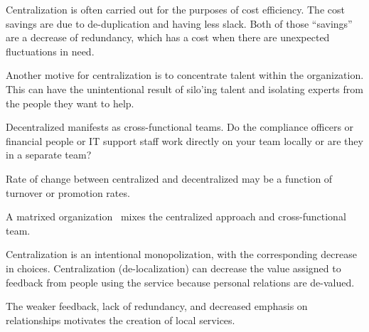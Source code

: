 
Centralization is often carried out for the purposes of cost efficiency. The cost savings are due to de-duplication and having less slack. Both of those ``savings'' are a decrease of redundancy, which has a cost when there are unexpected fluctuations in need. 

Another motive for centralization is to concentrate talent within the organization. This can have the unintentional result of silo'ing talent and isolating experts from the people they want to help.

Decentralized manifests as cross-functional teams. Do the compliance officers or financial people or IT support staff work directly on your team locally or are they in a separate team?

Rate of change between centralized and decentralized may be a function of turnover or promotion rates. 

A matrixed organization~\cite{1985_NASA} mixes the centralized approach and cross-functional team.



Centralization is an intentional monopolization, with the corresponding decrease in choices. 
Centralization (de-localization) can decrease the value assigned to feedback from people using the service because personal relations are de-valued. 

The weaker feedback, lack of redundancy, and decreased emphasis on relationships motivates the creation of local services. 


